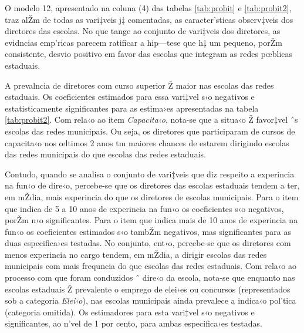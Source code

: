\documentclass[a4paper, 12pt]{article}
\begin{document}
O modelo 12, apresentado na coluna (4) das tabelas \ref{tab:probit} e \ref{tab:probit2}, traz alŽm de todas as vari‡veis j‡ comentadas, as caracter’sticas observ‡veis dos diretores das escolas. No que tange ao conjunto de vari‡veis dos diretores, as evidncias emp’ricas parecem ratificar a hip—tese que h‡ um pequeno, porŽm consistente, desvio positivo em favor das escolas que integram as redes pœblicas estaduais. 

A prevalncia de diretores com curso superior Ž maior nas escolas das redes estaduais. Os coeficientes estimados para essa vari‡vel s‹o negativos e estatisticamente significantes para as estima›es apresentadas na tabela \ref{tab:probit2}. Com rela‹o ao item \emph{Capacita‹o}, nota-se que a situa‹o Ž favor‡vel ˆs escolas das redes municipais. Ou seja, os diretores  que participaram de cursos de capacita‹o nos œltimos 2 anos tm maiores chances de estarem dirigindo escolas das redes municipais do que escolas das redes estaduais. 

Contudo, quando se analisa o conjunto de vari‡veis que diz respeito a experincia na fun‹o de dire‹o, percebe-se que os diretores das escolas estaduais tendem a ter, em mŽdia, mais experincia do que os diretores de escolas municipais. Para o item que indica de 5 a 10 anos de experincia na fun‹o os coeficientes s‹o negativos, porŽm n‹o significantes. Para o item que indica mais de 10 anos de experincia na fun‹o os coeficientes estimados s‹o tambŽm negativos, mas significantes para as duas especifica›es testadas. No conjunto, ent‹o, percebe-se que os diretores com menos experincia no cargo tendem, em mŽdia, a dirigir escolas das redes municipais com mais frequncia do que escolas das redes estaduais. Com rela‹o ao processo com que foram conduzidos ˆ dire‹o da escola, nota-se que enquanto nas escolas estaduais Ž prevalente o emprego de elei›es ou concursos (representados sob a categoria \emph{Elei‹o}), nas escolas municipais ainda prevalece a indica‹o pol’tica (categoria omitida). Os estimadores para esta vari‡vel s‹o negativos e significantes, ao n’vel de 1 por cento, para ambas especifica›es testadas. 
\end{document}

